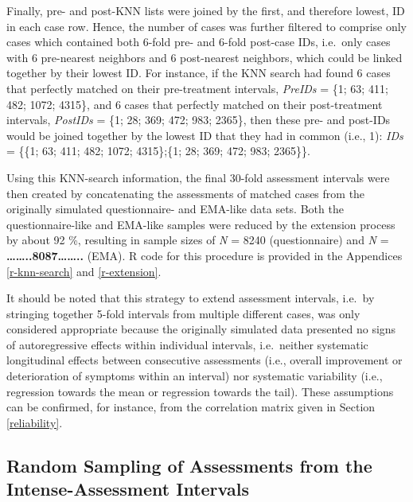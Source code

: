 \documentclass[12pt,twoside]{reedthesis}
\begin{document}
\par

Finally, pre- and post-KNN lists were joined by the first, and therefore lowest, ID in each case row. Hence, the number of cases was further filtered to comprise only cases which contained both 6-fold pre- and 6-fold post-case IDs, i.e.~only cases with 6 pre-nearest neighbors and 6 post-nearest neighbors, which could be linked together by their lowest ID. For instance, if the KNN search had found 6 cases that perfectly matched on their pre-treatment intervals, \emph{PreIDs} = \{1; 63; 411; 482; 1072; 4315\}, and 6 cases that perfectly matched on their post-treatment intervals, \emph{PostIDs} = \{1; 28; 369; 472; 983; 2365\}, then these pre- and post-IDs would be joined together by the lowest ID that they had in common (i.e., 1): \emph{IDs} = \{\{1; 63; 411; 482; 1072; 4315\};\{1; 28; 369; 472; 983; 2365\}\}.

\par

Using this KNN-search information, the final 30-fold assessment intervals were then created by concatenating the assessments of matched cases from the originally simulated questionnaire- and EMA-like data sets. Both the questionnaire-like and EMA-like samples were reduced by the extension process by about 92 \%, resulting in sample sizes of \emph{N} = 8240 (questionnaire) and \emph{N} = \textbf{\ldots\ldots..8087\ldots\ldots..} (EMA). R code for this procedure is provided in the Appendices \ref{r-knn-search} and \ref{r-extension}.

\par

It should be noted that this strategy to extend assessment intervals, i.e.~by stringing together 5-fold intervals from multiple different cases, was only considered appropriate because the originally simulated data presented no signs of autoregressive effects within individual intervals, i.e.~neither systematic longitudinal effects between consecutive assessments (i.e., overall improvement or deterioration of symptoms within an interval) nor systematic variability (i.e., regression towards the mean or regression towards the tail). These assumptions can be confirmed, for instance, from the correlation matrix given in Section \ref{reliability}.

\hypertarget{random-sampling-of-assessments-from-the-intense-assessment-intervals}{%
\subsection{Random Sampling of Assessments from the Intense-Assessment Intervals}\label{random-sampling-of-assessments-from-the-intense-assessment-intervals}}
\end{document}
